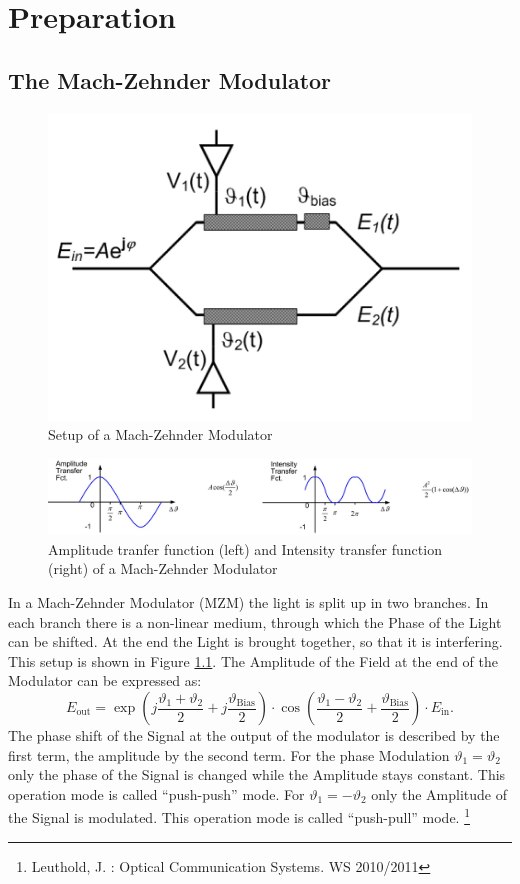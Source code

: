 
\chapter{Preparation}
\section{The Mach-Zehnder Modulator}
\begin{figure}[h]
  \centering
  \includegraphics[width=.5\columnwidth]{Grafiken/Mach-Zehnder.jpg}

\caption{Setup of a Mach-Zehnder Modulator}
\label{fig:MZI}
\end{figure}
\begin{figure}[ht]
  \centering
  \includegraphics[width=\columnwidth]{Grafiken/Mach-Zender-Transfer1.jpg}

\caption{Amplitude tranfer function (left) and Intensity transfer function (right) of a Mach-Zehnder Modulator }
\label{fig:MZI_plot}
\end{figure}


In a Mach-Zehnder Modulator (MZM) the light is split up in two branches. In each branch there is a non-linear medium, through which the Phase of the Light can be shifted. At the end the Light is brought together, so that it is interfering. This setup is shown in Figure \ref{fig:MZI}. The Amplitude of the Field at the end of the Modulator can be expressed as:
\begin{equation}
 E_{\mathrm{out}}=\exp\left(j\frac{\vartheta_1+\vartheta_2}{2}+j\frac{\vartheta_{\mathrm{Bias}}}{2} \right)\cdot\cos\left(\frac{\vartheta_1-\vartheta_2}{2}+\frac{\vartheta_{\mathrm{Bias}}}{2}\right)\cdot E_{\mathrm{in}} .
\end{equation}
The phase shift of the Signal at the output of the modulator is described by the first term, the amplitude by the second term. For the phase Modulation $\vartheta_1 = \vartheta_2$ only the phase of the Signal is changed while the Amplitude stays constant. This operation mode is called "`push-push"' mode. For $\vartheta_1 = -\vartheta_2$ only the Amplitude of the Signal is modulated. This operation mode is called "`push-pull"' mode. \footnote[1]{Leuthold, J. : Optical Communication Systems. WS 2010/2011}



